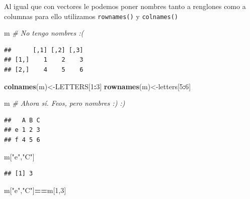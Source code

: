 \documentclass[
]{book}
\newenvironment{Shaded}{\begin{snugshade}}{\end{snugshade}}
\newcommand{\CommentTok}[1]{\textcolor[rgb]{0.56,0.35,0.01}{\textit{#1}}}
\newcommand{\DecValTok}[1]{\textcolor[rgb]{0.00,0.00,0.81}{#1}}
\newcommand{\FunctionTok}[1]{\textcolor[rgb]{0.13,0.29,0.53}{\textbf{#1}}}
\newcommand{\NormalTok}[1]{#1}
\newcommand{\OtherTok}[1]{\textcolor[rgb]{0.56,0.35,0.01}{#1}}
\newcommand{\SpecialCharTok}[1]{\textcolor[rgb]{0.81,0.36,0.00}{\textbf{#1}}}
\newcommand{\StringTok}[1]{\textcolor[rgb]{0.31,0.60,0.02}{#1}}
\begin{document}
Al igual que con vectores le podemos poner nombres tanto a renglones como a columnas para ello utilizamos \texttt{rownames()} y \texttt{colnames()}

\begin{Shaded}
\begin{Highlighting}[]
\NormalTok{m   }\CommentTok{\# No tengo nombres :(}
\end{Highlighting}
\end{Shaded}

\begin{verbatim}
##      [,1] [,2] [,3]
## [1,]    1    2    3
## [2,]    4    5    6
\end{verbatim}

\begin{Shaded}
\begin{Highlighting}[]
\FunctionTok{colnames}\NormalTok{(m)}\OtherTok{\textless{}{-}}\NormalTok{LETTERS[}\DecValTok{1}\SpecialCharTok{:}\DecValTok{3}\NormalTok{]}
\FunctionTok{rownames}\NormalTok{(m)}\OtherTok{\textless{}{-}}\NormalTok{letters[}\DecValTok{5}\SpecialCharTok{:}\DecValTok{6}\NormalTok{]}
\end{Highlighting}
\end{Shaded}

\begin{Shaded}
\begin{Highlighting}[]
\NormalTok{m   }\CommentTok{\# Ahora sí. Feos, pero nombres :) :)}
\end{Highlighting}
\end{Shaded}

\begin{verbatim}
##   A B C
## e 1 2 3
## f 4 5 6
\end{verbatim}

\begin{Shaded}
\begin{Highlighting}[]
\NormalTok{m[}\StringTok{"e"}\NormalTok{,}\StringTok{"C"}\NormalTok{]}
\end{Highlighting}
\end{Shaded}

\begin{verbatim}
## [1] 3
\end{verbatim}

\begin{Shaded}
\begin{Highlighting}[]
\NormalTok{m[}\StringTok{"e"}\NormalTok{,}\StringTok{"C"}\NormalTok{]}\SpecialCharTok{==}\NormalTok{m[}\DecValTok{1}\NormalTok{,}\DecValTok{3}\NormalTok{]}
\end{Highlighting}
\end{Shaded}
\end{document}
